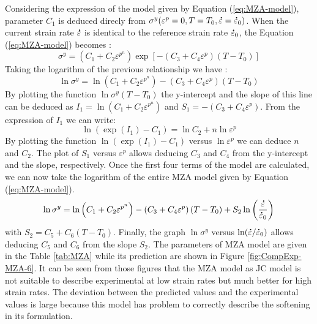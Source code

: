 \documentclass[twoside,english,1p,final,sort&compress]{elsarticle}
\theoremstyle{plain}
\DeclareRobustCommand{\mdot}[1]{\accentset{\mbox{\bfseries .}}{#1}}
\begin{document}
Considering the expression of the model given by Equation (\ref{eq:MZA-model}), parameter $C_1$ is deduced direcly from $\sigma^y(\varepsilon^p=0,T=T_0,\mdot\varepsilon=\mdot{\varepsilon}_0)$.
When the current strain rate $\mdot\varepsilon$ is identical to the reference strain rate $\mdot{\varepsilon}_0$, the Equation (\ref{eq:MZA-model}) becomes :
\begin{equation}
\sigma^y = \left(C_{1}+C_{2}\varepsilon^{p^n}\right) \exp\left[-\left(C_{3}+C_{4}\varepsilon^p\right)\left(T-T_0\right)\right]
\end{equation}
Taking the logarithm of the previous relationship we have :
\begin{equation}
\ln\sigma^y = \ln\left(C_{1}+C_{2}\varepsilon^{p^n}\right)-\left(C_{3}+C_{4}\varepsilon^p\right)\left(T-T_0\right)
\end{equation}
By plotting the function $\ln\sigma^y\left(T-T_0\right)$ the y-intercept and the slope of this line can be deduced as $I_1=\ln\left(C_1+C_2\varepsilon^{p^n}\right)$ and $S_1=-\left(C_3+C_4\varepsilon^p\right)$.
From the expression of $I_1$ we can write:
\begin{equation}
\ln\left(\exp(I_1)-C_1\right) = \ln C_2+n\ln\varepsilon^p
\end{equation}
By plotting the function $\ln\left(\exp(I_1)-C_1\right)$ versus $\ln\varepsilon^p$ we can deduce $n$ and $C_2$.
The plot of $S_1$ versus $\varepsilon^p$ allows deducing $C_3$ and $C_4$ from the y-intercept and the slope, respectively.
Once the first four terms of the model are calculated, we can now take the logarithm of the entire MZA model given by Equation (\ref{eq:MZA-model}).
\begin{equation}
\ln\sigma^y = \ln\left(C_{1}+C_{2}\varepsilon^{p^n}\right) - \left(C_{3}+C_{4}\varepsilon^p\right)\left(T-T_0\right) + S_2\ln\left( \frac{\mdot\varepsilon}{\mdot{\varepsilon}_0}\right)
\end{equation}
with $S_2=C_5+C_6\left(T-T_0\right)$.
Finally, the graph $\ln\sigma^y$ versus $ \ln(\mdot\varepsilon/\mdot{\varepsilon}_0)$ allows deducing $C_5$ and $C_6$ from the slope $S_2$.
The parameters of MZA model are given in the Table \ref{tab:MZA} while its prediction are shown in Figure \ref{fig:CompExp-MZA-6}.
It can be seen from those figures that the MZA model as JC model is not suitable to describe experimental at low strain rates but much better for high strain rates.
The deviation between the predicted values and the experimental values is large because this model has problem to correctly describe the softening in its formulation.
\end{document}
